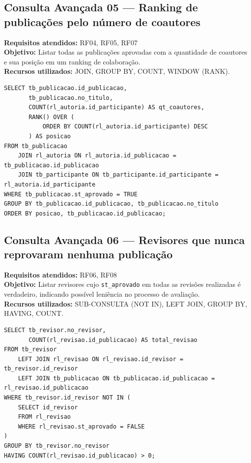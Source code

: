 \documentclass[12pt,a4paper]{article}
\begin{document}
\subsection{Consulta Avançada 05 --- Ranking de publicações pelo número de coautores}
\textbf{Requisitos atendidos:} RF04, RF05, RF07 \\
\textbf{Objetivo:} Listar todas as publicações aprovadas com a quantidade de coautores e sua posição em um ranking de colaboração. \\
\textbf{Recursos utilizados:} JOIN, GROUP BY, COUNT, WINDOW (RANK).
\begin{lstlisting}[caption={QA05 --- Ranking de publicações pelo número de coautores.}]
SELECT tb_publicacao.id_publicacao,
       tb_publicacao.no_titulo,
       COUNT(rl_autoria.id_participante) AS qt_coautores,
       RANK() OVER (
           ORDER BY COUNT(rl_autoria.id_participante) DESC
       ) AS posicao
FROM tb_publicacao
    JOIN rl_autoria ON rl_autoria.id_publicacao = tb_publicacao.id_publicacao
    JOIN tb_participante ON tb_participante.id_participante = rl_autoria.id_participante
WHERE tb_publicacao.st_aprovado = TRUE
GROUP BY tb_publicacao.id_publicacao, tb_publicacao.no_titulo
ORDER BY posicao, tb_publicacao.id_publicacao;
\end{lstlisting}

\subsection{Consulta Avançada 06 --- Revisores que nunca reprovaram nenhuma publicação}
\textbf{Requisitos atendidos:} RF06, RF08 \\
\textbf{Objetivo:} Listar revisores cujo \texttt{st\_aprovado} em todas as revisões realizadas é verdadeiro, indicando possível leniência no processo de avaliação. \\
\textbf{Recursos utilizados:} SUB-CONSULTA (NOT IN), LEFT JOIN, GROUP BY, HAVING, COUNT.
\begin{lstlisting}[caption={QA06 --- Revisores que nunca reprovaram nenhuma publicação.}]
SELECT tb_revisor.no_revisor,
       COUNT(rl_revisao.id_publicacao) AS total_revisao
FROM tb_revisor
    LEFT JOIN rl_revisao ON rl_revisao.id_revisor = tb_revisor.id_revisor
    LEFT JOIN tb_publicacao ON tb_publicacao.id_publicacao = rl_revisao.id_publicacao
WHERE tb_revisor.id_revisor NOT IN (
    SELECT id_revisor
    FROM rl_revisao
    WHERE rl_revisao.st_aprovado = FALSE
)
GROUP BY tb_revisor.no_revisor
HAVING COUNT(rl_revisao.id_publicacao) > 0;
\end{lstlisting}
\end{document}
